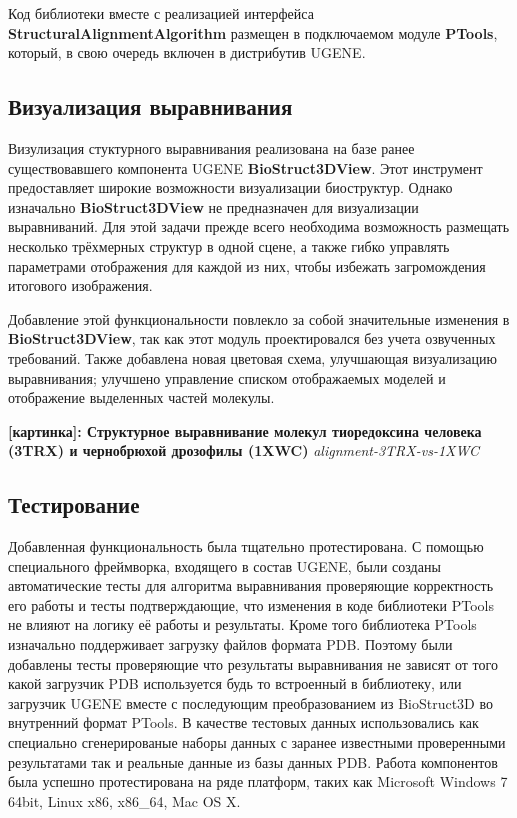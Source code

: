 \documentclass[a4paper, 12pt, titlepage, utf8]{extarticle}
\newcommand{\class}{\textbf}
\newcommand{\module}{\class}
\newcommand{\myimage}[2]{   
    \begin{center} \textbf{[картинка]: #1} \textit{#2} \end{center} 
}
\begin{document}
Код библиотеки вместе с реализацией интерфейса \class{StructuralAlignmentAlgorithm} размещен в подключаемом модуле \module{PTools}, который, в свою очередь включен в дистрибутив UGENE.

\subsection{Визуализация выравнивания}
Визулизация стуктурного выравнивания реализована на базе ранее существовавшего компонента UGENE \module{BioStruct3DView}. Этот инструмент предоставляет широкие возможности визуализации биоструктур. Однако изначально \module{BioStruct3DView} не предназначен для визуализации выравниваний. Для этой задачи прежде всего необходима возможность размещать несколько трёхмерных структур в одной сцене, а также гибко управлять параметрами отображения для каждой из них, чтобы избежать загромождения итогового изображения. 

Добавление этой функциональности повлекло за собой значительные изменения в \module{BioStruct3DView}, так как этот модуль проектировался без учета озвученных требований. Также добавлена новая цветовая схема, улучшающая визуализацию выравнивания; улучшено управление списком отображаемых моделей и отображение выделенных частей молекулы.

\myimage{Структурное выравнивание молекул тиоредоксина человека (3TRX) и чернобрюхой дрозофилы (1XWC)}{alignment-3TRX-vs-1XWC}

\subsection{Тестирование}
Добавленная функциональность была тщательно протестирована. С помощью специального фреймворка, входящего в состав UGENE, были созданы автоматические тесты для алгоритма выравнивания проверяющие корректность его работы и тесты подтверждающие, что изменения в коде библиотеки PTools не влияют на логику её работы и результаты. Кроме того библиотека PTools изначально поддерживает загрузку файлов формата PDB. Поэтому были добавлены тесты проверяющие что результаты выравнивания не зависят от того какой загрузчик PDB используется будь то встроенный в библиотеку, или загрузчик UGENE вместе с последующим преобразованием из BioStruct3D во внутренний формат PTools. В качестве тестовых данных использовались как специально сгенерированые наборы данных с заранее известными проверенными результатами так и реальные данные из базы данных PDB. Работа компонентов была успешно протестирована на ряде платформ, таких как Microsoft Windows 7 64bit, Linux x86, x86\_64, Mac OS X.
\end{document}
